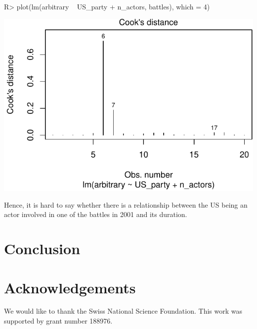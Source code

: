 \documentclass[
]{jss}
\begin{document}
\begin{CodeChunk}
\begin{CodeInput}
R> plot(lm(arbitrary ~ US_party + n_actors, battles), which = 4)
\end{CodeInput}


\begin{center}\includegraphics{messydates_article_files/figure-latex/outliers-1} \end{center}

\end{CodeChunk}

Hence, it is hard to say whether there is a relationship between the US
being an actor involved in one of the battles in 2001 and its duration.

\hypertarget{conclusion}{%
\section{Conclusion}\label{conclusion}}

\hypertarget{acknowledgements}{%
\section{Acknowledgements}\label{acknowledgements}}

We would like to thank the Swiss National Science Foundation. This work
was supported by grant number 188976.

\renewcommand\refname{References}

\end{document}

